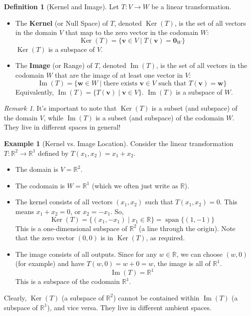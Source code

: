 \documentclass[11pt]{article}
\theoremstyle{definition}
\newtheorem{definition}[theorem]{Definition}
\newtheorem{example}[theorem]{Example}
\theoremstyle{remark}
\newtheorem{remark}[theorem]{Remark}
\DeclareMathOperator{\Ker}{Ker}
\DeclareMathOperator{\Image}{Im}
\DeclareMathOperator{\Span}{span}
\begin{document}
\begin{definition}[Kernel and Image]
Let $T: V \to W$ be a linear transformation.
\begin{itemize}
    \item The \textbf{Kernel} (or Null Space) of $T$, denoted $\Ker(T)$, is the set of all vectors in the domain $V$ that map to the zero vector in the codomain $W$:
    \[ \Ker(T) = \{ \mathbf{v} \in V \mid T(\mathbf{v}) = \mathbf{0}_W \} \]
    $\Ker(T)$ is a subspace of $V$.
    \item The \textbf{Image} (or Range) of $T$, denoted $\Image(T)$, is the set of all vectors in the codomain $W$ that are the image of at least one vector in $V$:
    \[ \Image(T) = \{ \mathbf{w} \in W \mid \text{there exists } \mathbf{v} \in V \text{ such that } T(\mathbf{v}) = \mathbf{w} \} \]
    Equivalently, $\Image(T) = \{ T(\mathbf{v}) \mid \mathbf{v} \in V \}$. $\Image(T)$ is a subspace of $W$.
\end{itemize}
\end{definition}

\begin{remark}
It's important to note that $\Ker(T)$ is a subset (and subspace) of the domain $V$, while $\Image(T)$ is a subset (and subspace) of the codomain $W$. They live in different spaces in general!
\end{remark}

\begin{example}[Kernel vs. Image Location]
Consider the linear transformation $T: \mathbb{R}^2 \to \mathbb{R}^1$ defined by $T(x_1, x_2) = x_1 + x_2$.
\begin{itemize}
    \item The domain is $V = \mathbb{R}^2$.
    \item The codomain is $W = \mathbb{R}^1$ (which we often just write as $\mathbb{R}$).
    \item The kernel consists of all vectors $(x_1, x_2)$ such that $T(x_1, x_2) = 0$. This means $x_1 + x_2 = 0$, or $x_2 = -x_1$. So,
    \[ \Ker(T) = \{ (x_1, -x_1) \mid x_1 \in \mathbb{R} \} = \Span \{ (1, -1) \} \]
    This is a one-dimensional subspace of $\mathbb{R}^2$ (a line through the origin). Note that the zero vector $(0,0)$ is in $\Ker(T)$, as required.
    \item The image consists of all outputs. Since for any $w \in \mathbb{R}$, we can choose $(w, 0)$ (for example) and have $T(w, 0) = w+0=w$, the image is all of $\mathbb{R}^1$.
    \[ \Image(T) = \mathbb{R}^1 \]
    This is a subspace of the codomain $\mathbb{R}^1$.
\end{itemize}
Clearly, $\Ker(T)$ (a subspace of $\mathbb{R}^2$) cannot be contained within $\Image(T)$ (a subspace of $\mathbb{R}^1$), and vice versa. They live in different ambient spaces.
\end{example}
\end{document}
